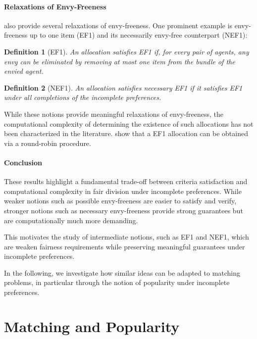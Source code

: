 \documentclass{article}
\newtheorem{definition}{Definition}
\begin{document}
\paragraph{Relaxations of Envy-Freeness} \cite{aziz2024computational} also provide several relaxations of envy-freeness.
One prominent example is envy-freeness up to one item (EF1) and its necessarily envy-free counterpart (NEF1):

\begin{definition}[EF1]
An allocation satisfies EF1 if, for every pair of agents, any envy can be eliminated by removing at most one item from the bundle of the envied agent.
\end{definition}

\begin{definition}[NEF1]
An allocation satisfies necessary EF1 if it satisfies EF1 under all completions of the incomplete preferences. 
\end{definition}

While these notions provide meaningful relaxations of envy-freeness, the computational complexity of determining the existence of such allocations has not been characterized in the literature. 
\cite{aziz2024computational} show that a EF1 allocation can be obtained via a round-robin procedure.

\paragraph{Conclusion} These results highlight a fundamental trade-off between criteria satisfaction and computational complexity in fair division under incomplete preferences. 
While weaker notions such as possible envy-freeness are easier to satisfy and verify, stronger notions such as necessary envy-freeness provide strong guarantees but are computationally much more demanding.

This motivates the study of intermediate notions, such as EF1 and NEF1, which are weaken fairness requirements while preserving meaningful guarantees under incomplete preferences.

In the following, we investigate how similar ideas can be adapted to matching problems, in particular through the notion of popularity under incomplete preferences.


\section{Matching and Popularity}
\end{document}
